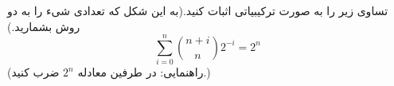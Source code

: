 \EXERCISE
تساوی زیر را به صورت ترکیبیاتی اثبات کنید.(به این شکل که تعدادی شیء را به دو روش بشمارید.)
$$\sum_{i=0}^{n}\binom{n+i}{n}2^{-i} = 2^{n}$$
(راهنمایی: در طرفین معادله 
$2^{n}$
ضرب کنید.)